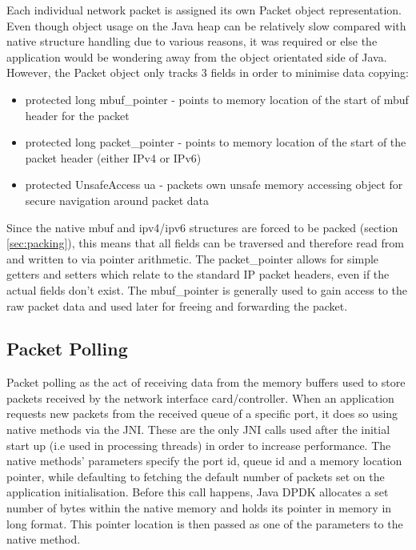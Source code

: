 \documentclass[final_report.tex]{subfiles}
\begin{document}
Each individual network packet is assigned its own Packet object representation. Even though object usage on the Java heap can be relatively slow compared with native structure handling due to various reasons, it was required or else the application would be wondering away from the object orientated side of Java. However, the Packet object only tracks 3 fields in order to minimise data copying:

\begin{itemize}
	\item protected long mbuf\_pointer - points to memory location of the start of mbuf header for the packet
	\item protected long packet\_pointer - points to memory location of the start of the packet header (either IPv4 or IPv6)
	\item protected UnsafeAccess ua - packets own unsafe memory accessing object for secure navigation around packet data
\end{itemize}

Since the native mbuf and ipv4/ipv6 structures are forced to be packed (section \ref{sec:packing}), this means that all fields can be traversed and therefore read from and written to via pointer arithmetic. The packet\_pointer allows for simple getters and setters which relate to the standard IP packet headers, even if the actual fields don't exist. The mbuf\_pointer is generally used to gain access to the raw packet data and used later for freeing and forwarding the packet.

\subsection{Packet Polling}
\label{sec:poll}
Packet polling as the act of receiving data from the memory buffers used to store packets received by the network interface card/controller. When an application requests new packets from the received queue of a specific port, it does so using native methods via the JNI. These are the only JNI calls used after the initial start up (i.e used in processing threads) in order to increase performance. The native methods' parameters specify the port id, queue id and a memory location pointer, while defaulting to fetching the default number of packets set on the application initialisation. Before this call happens, Java DPDK allocates a set number of bytes within the native memory and holds its pointer in memory in long format. This pointer location is then passed as one of the parameters to the native method.
\end{document}
